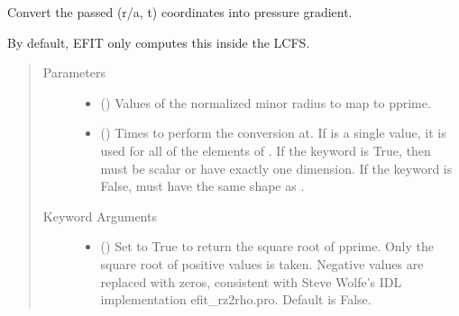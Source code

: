 \documentclass[letterpaper,10pt,english]{sphinxmanual}
\begin{document}
\begin{fulllineitems}
\begin{fulllineitems}
\end{fulllineitems}


\begin{fulllineitems}
\label{\detokenize{eqtools:eqtools.core.Equilibrium.roa2pprime}}
Convert the passed (r/a, t) coordinates into pressure gradient.

By default, EFIT only computes this inside the LCFS.
\begin{quote}\begin{description}
\item[{Parameters}] \leavevmode\begin{itemize}
\item {} 
 () \textendash{} Values of the normalized minor
radius to map to pprime.

\item {} 
 () \textendash{} Times to perform the conversion at.
If  is a single value, it is used for all of the elements of
. If the  keyword is True, then  must be scalar
or have exactly one dimension. If the  keyword is False,
 must have the same shape as .

\end{itemize}

\item[{Keyword Arguments}] \leavevmode\begin{itemize}
\item {} 
 () \textendash{} Set to True to return the square root of pprime.
Only the square root of positive values is taken. Negative
values are replaced with zeros, consistent with Steve Wolfe’s
IDL implementation efit\_rz2rho.pro. Default is False.


\end{itemize}
\end{description}
\end{quote}
\end{fulllineitems}
\end{fulllineitems}
\end{document}
